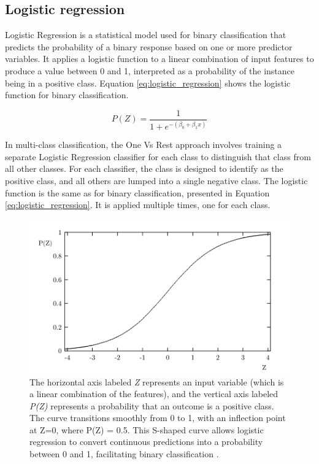         \newpage

        \subsection{Logistic regression}
            Logistic Regression is a statistical model used for binary classification that predicts the probability of a binary response based on one or more predictor variables. It applies a logistic function to a linear combination of input features to produce a value between 0 and 1, interpreted as a probability of the instance being in a positive class.
            Equation \ref{eq:logistic_regression} shows the logistic function for binary classification.

            \begin{equation} \label{eq:logistic_regression}
                P(Z) = \frac{1}{1 + e^{-(\beta_0 + \beta_1 x)}}
            \end{equation}

            In multi-class classification, the One Vs Rest approach involves training a separate Logistic Regression classifier for each class to distinguish that class from all other classes. For each classifier, the class is designed to identify as the positive class, and all others are lumped into a single negative class.
            The logistic function is the same as for binary classification, presented in Equation \ref{eq:logistic_regression}. It is applied multiple times, one for each class.
            
            \begin{figure}[htbp]
                \centering
                \includegraphics[width=.8\textwidth]{../src/resources/images/models/logistic.png}
                \caption{
                    The horizontal axis labeled \textit{Z} represents an input variable (which is a linear combination of the features), and the vertical axis labeled \textit{P(Z)} represents a probability that an outcome is a positive class. The curve transitions smoothly from 0 to 1, with an inflection point at Z=0, where P(Z) = 0.5. This S-shaped curve allows logistic regression to convert continuous predictions into a probability between 0 and 1, facilitating binary classification \cite{cramer_origins_2002}.
                }
                \label{fig:logistic_regression}
            \end{figure}

